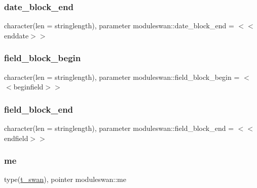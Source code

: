 \subsubsection{\texorpdfstring{date\+\_\+block\+\_\+end}{date\_block\_end}}
{\footnotesize\ttfamily character(len = stringlength), parameter moduleswan\+::date\+\_\+block\+\_\+end = \textquotesingle{}$<$$<$enddate$>$$>$\textquotesingle{}\hspace{0.3cm}{\ttfamily [private]}}

\mbox{\label{namespacemoduleswan_af262e5ee084e83d947faf8fe673eedba}} 
\subsubsection{\texorpdfstring{field\+\_\+block\+\_\+begin}{field\_block\_begin}}
{\footnotesize\ttfamily character(len = stringlength), parameter moduleswan\+::field\+\_\+block\+\_\+begin = \textquotesingle{}$<$$<$beginfield$>$$>$\textquotesingle{}\hspace{0.3cm}{\ttfamily [private]}}

\mbox{\label{namespacemoduleswan_a725d01d351dc51cdd8457e9307160045}} 
\subsubsection{\texorpdfstring{field\+\_\+block\+\_\+end}{field\_block\_end}}
{\footnotesize\ttfamily character(len = stringlength), parameter moduleswan\+::field\+\_\+block\+\_\+end = \textquotesingle{}$<$$<$endfield$>$$>$\textquotesingle{}\hspace{0.3cm}{\ttfamily [private]}}

\mbox{\label{namespacemoduleswan_a0b7319827ebd8a624b35bfba2c2ff6e1}} 
\subsubsection{\texorpdfstring{me}{me}}
{\footnotesize\ttfamily type(\mbox{\hyperlink{structmoduleswan_1_1t__swan}{t\+\_\+swan}}), pointer moduleswan\+::me\hspace{0.3cm}{\ttfamily [private]}}

